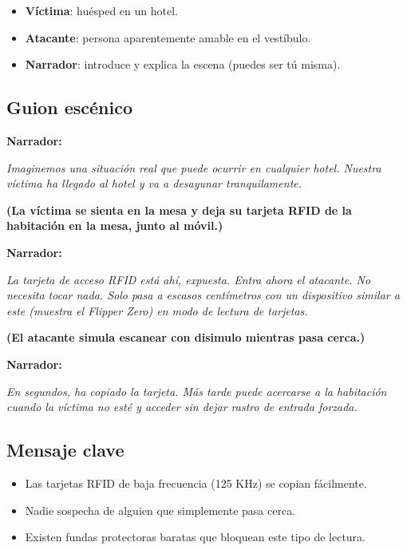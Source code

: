 \documentclass[a4paper,12pt]{article}
\begin{document}
\begin{itemize}
    \item \textbf{Víctima}: huésped en un hotel.
    \item \textbf{Atacante}: persona aparentemente amable en el vestíbulo.
    \item \textbf{Narrador}: introduce y explica la escena (puedes ser tú misma).
\end{itemize}

\subsection*{Guion escénico}

\textbf{Narrador:}

\textit{Imaginemos una situación real que puede ocurrir en cualquier hotel. Nuestra víctima ha llegado al hotel y va a desayunar tranquilamente.}

\textbf{(La víctima se sienta en la mesa y deja su tarjeta RFID de la habitación en la mesa, junto al móvil.)}

\textbf{Narrador:}

\textit{La tarjeta de acceso RFID está ahí, expuesta. Entra ahora el atacante. No necesita tocar nada. Solo pasa a escasos centímetros con un dispositivo similar a este (muestra el Flipper Zero) en modo de lectura de tarjetas.}

\textbf{(El atacante simula escanear con disimulo mientras pasa cerca.)}

\textbf{Narrador:}

\textit{En segundos, ha copiado la tarjeta. Más tarde puede acercarse a la habitación cuando la víctima no esté y acceder sin dejar rastro de entrada forzada.}

\subsection*{Mensaje clave}

\begin{itemize}
    \item Las tarjetas RFID de baja frecuencia (125 KHz) se copian fácilmente.
    \item Nadie sospecha de alguien que simplemente pasa cerca.
    \item Existen fundas protectoras baratas que bloquean este tipo de lectura.
\end{itemize}
\end{document}
